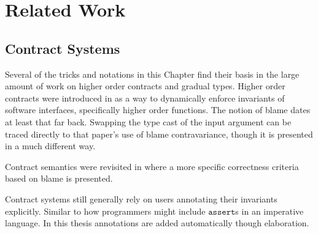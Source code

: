 \section{Related Work}
 
 
 
 
\subsection{Contract Systems}
 
Several of the tricks and notations in this Chapter find their basis in the large amount of work on higher order contracts and gradual types.
Higher order contracts were introduced in \cite{10.1145/581478.581484} as a way to dynamically enforce invariants of software interfaces, specifically higher order functions.
The notion of blame dates at least that far back. Swapping the type cast of the input argument can be traced directly to that paper's use of blame contravariance, though it is presented in a much different way.
 
Contract semantics were revisited in \cite{10.1145/1925844.1926410,10.1007/978-3-642-28869-2_11} where a more specific correctness criteria based on blame is presented.
 
Contract systems still generally rely on users annotating their invariants explicitly.
Similar to how programmers might include $\mathtt{assert}$s in an imperative language.
In this thesis annotations are added automatically though elaboration.
 
